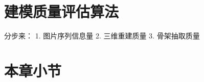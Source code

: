 \section{建模质量评估算法}
\label{sec:qualityevaluation}
分步来：
1. 图片序列信息量
2. 三维重建质量
3. 骨架抽取质量

\section{本章小节}
\label{sec:conclusion}
